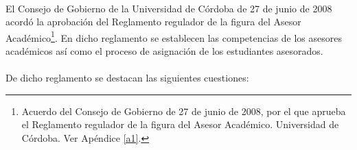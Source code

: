 \paragraph{}El Consejo de Gobierno de la Universidad de Córdoba de 27 de junio
de 2008 acordó la aprobación del Reglamento regulador de la figura del Asesor
Académico\footnote{Acuerdo del Consejo de Gobierno de 27 de junio de 2008, por
el que aprueba el Reglamento regulador de la figura del Asesor Académico.
Universidad de Córdoba. Ver Apéndice \ref{a1}.}. En dicho reglamento se
establecen las competencias de los asesores académicos así como el proceso de
asignación de los estudiantes asesorados.

\paragraph{}De dicho reglamento se destacan las siguientes cuestiones:

